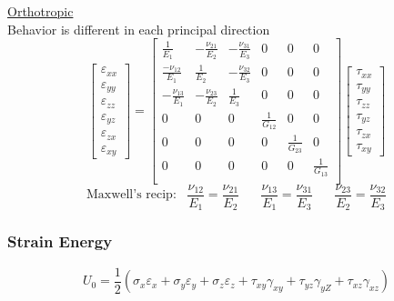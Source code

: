 \documentclass[twocolumn, 12pt]{article}    %
\begin{document}
\underline{Orthotropic}\\
Behavior is different in each principal direction
\begin{equation*}
        \begin{bmatrix}
        \varepsilon_{xx} \\
        \varepsilon_{yy}\\
        \varepsilon_{zz}\\
        \varepsilon_{yz}\\
        \varepsilon_{zx}\\
        \varepsilon_{xy}
    \end{bmatrix} = 
    \begin{bmatrix}
        \frac{1}{E_1} & -\frac{\nu_{21}}{E_2} & -\frac{\nu_{31}}{E_3} &0 &0 &0\\
        \frac{-\nu_{12}}{E_1} & \frac{1}{E_2} & -\frac{\nu_{32}}{E_3} &0 &0 &0\\
        -\frac{\nu_{13}}{E_1} & -\frac{\nu_{23}}{E_2} & \frac{1}{E_3} &0 &0 &0\\
        0& 0 &0 &\frac{1}{G_{12}} &0 &0\\
        0& 0 &0 &0 &\frac{1}{G_{23}} &0 \\
        0 &0 &0 &0 &0 &\frac{1}{G_{13}}\\
    \end{bmatrix}
    \begin{bmatrix}
        \tau_{xx}\\
        \tau_{yy}\\
        \tau_{zz}\\
        \tau_{yz}\\
        \tau_{zx}\\
        \tau_{xy}
    \end{bmatrix}
\end{equation*}
\begin{equation*}
    \text{Maxwell's recip:} \hspace{10pt} \frac{\nu_{12}}{E_1} = \frac{\nu_{21}}{E_2} \hspace{20pt} \frac{\nu_{13}}{E_1}=\frac{\nu_{31}}{E_3} \hspace{20pt} \frac{\nu_{23}}{E_2}=\frac{\nu_{32}}{E_3}
\end{equation*}

\subsubsection*{Strain Energy}
\begin{equation*}
    U_0 = \frac{1}{2}(\sigma_x\varepsilon_x +\sigma_y\varepsilon_y + \sigma_z\varepsilon_z + \tau_{xy}\gamma_{xy} + \tau_{yz}\gamma_{yZ} + \tau_{xz}\gamma_{xz})
\end{equation*}
\end{document}
